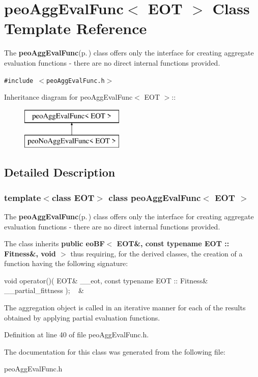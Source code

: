 \section{peo\-Agg\-Eval\-Func$<$ EOT $>$ Class Template Reference}
\label{classpeo_agg_eval_func}
The {\bf peo\-Agg\-Eval\-Func}{\rm (p.\,\pageref{classpeo_agg_eval_func})} class offers only the interface for creating aggregate evaluation functions - there are no direct internal functions provided.  


{\tt \#include $<$peo\-Agg\-Eval\-Func.h$>$}

Inheritance diagram for peo\-Agg\-Eval\-Func$<$ EOT $>$::\begin{figure}[H]
\begin{center}
\leavevmode
\includegraphics[height=2cm]{classpeo_agg_eval_func}
\end{center}
\end{figure}


\subsection{Detailed Description}
\subsubsection*{template$<$class EOT$>$ class peo\-Agg\-Eval\-Func$<$ EOT $>$}

The {\bf peo\-Agg\-Eval\-Func}{\rm (p.\,\pageref{classpeo_agg_eval_func})} class offers only the interface for creating aggregate evaluation functions - there are no direct internal functions provided. 

The class inherits {\bf public eo\-BF$<$ EOT\&, const typename EOT :: Fitness\&, void $>$} thus requiring, for the derived classes, the creation of a function having the following signature:

\begin{TabularC}{2}
\hline
void operator()( EOT\& \_\-\_\-eot, const typename EOT :: Fitness\& \_\-\_\-partial\_\-fittness ); ~ &~  \\\hline
\end{TabularC}


The aggregation object is called in an iterative manner for each of the results obtained by applying partial evaluation functions. 



Definition at line 40 of file peo\-Agg\-Eval\-Func.h.

The documentation for this class was generated from the following file:\begin{CompactItemize}
\item 
peo\-Agg\-Eval\-Func.h\end{CompactItemize}
